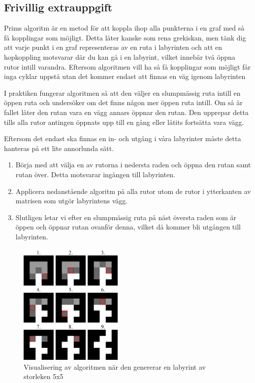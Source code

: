 \subsection{Frivillig extrauppgift}


Prims algoritm är en metod för att koppla ihop alla punkterna i en graf med så få kopplingar som möjligt. Detta låter kanske som rena grekiskan, men tänk dig att varje punkt i en graf representeras av en ruta i labyrinten och att en hopkoppling motsvarar där du kan gå i en labyrint, vilket innebär två öppna rutor intill varandra. Eftersom algoritmen vill ha så få kopplingar som möjligt får inga cyklar uppstå utan det kommer endast att finnas en väg igenom labyrinten

I praktiken fungerar algoritmen så att den väljer en slumpmässig ruta intill en öppen ruta och undersöker om det finns någon mer öppen ruta intill. Om så är fallet låter den rutan vara en vägg annars öppnar den rutan. Den upprepar detta tills alla rutor antingen öppnats upp till en gång eller låtits fortsätta vara vägg.

Eftersom det endast ska finnas en in- och utgång i våra labyrinter måste detta hanteras på ett lite annorlunda sätt.

\begin{enumerate}
	\item Börja med att välja en av rutorna i nedersta raden och öppna den rutan samt rutan över. Detta motsvarar ingången till labyrinten.
	\item Applicera nedanstående algoritm på alla rutor utom de rutor i ytterkanten av matrisen som utgör labyrintens vägg.
	\item Slutligen letar vi efter en slumpmässig ruta på näst översta raden som är öppen och öppnar rutan ovanför denna, vilket då kommer bli utgången till labyrinten.
\end{enumerate}

\begin{figure}[h]
	\begin{center}
		\includegraphics[width=0.45\textwidth]{../img/w09-lab/AlgorithmVisualized.png}
	\end{center}
	\caption{Visualisering av algoritmen när den genererar en labyrint av storleken 5x5}
\end{figure}

